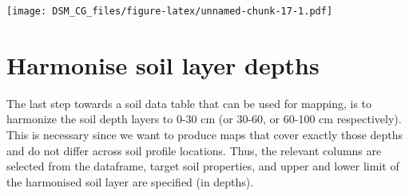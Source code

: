 \documentclass[
  10pt,
  b5paper,
  oneside]{book}
\newenvironment{Shaded}{\begin{snugshade}}{\end{snugshade}}
\newcommand{\AttributeTok}[1]{\textcolor[rgb]{0.77,0.63,0.00}{#1}}
\newcommand{\CommentTok}[1]{\textcolor[rgb]{0.56,0.35,0.01}{\textit{#1}}}
\newcommand{\DecValTok}[1]{\textcolor[rgb]{0.00,0.00,0.81}{#1}}
\newcommand{\FunctionTok}[1]{\textcolor[rgb]{0.00,0.00,0.00}{#1}}
\newcommand{\NormalTok}[1]{#1}
\newcommand{\OtherTok}[1]{\textcolor[rgb]{0.56,0.35,0.01}{#1}}
\newcommand{\SpecialCharTok}[1]{\textcolor[rgb]{0.00,0.00,0.00}{#1}}
\newcommand{\StringTok}[1]{\textcolor[rgb]{0.31,0.60,0.02}{#1}}
\begin{document}
\begin{Shaded}
\end{Shaded}

\texttt{[image: DSM\_CG\_files/figure-latex/unnamed-chunk-17-1.pdf]}

\hypertarget{harmonise-soil-layer-depths}{%
\section{Harmonise soil layer depths}\label{harmonise-soil-layer-depths}}

The last step towards a soil data table that can be used for mapping, is to harmonize the soil depth layers to 0-30 cm (or 30-60, or 60-100 cm respectively). This is necessary since we want to produce maps that cover exactly those depths and do not differ across soil profile locations. Thus, the relevant columns are selected from the dataframe, target soil properties, and upper and lower limit of the harmonised soil layer are specified (in depths).
\end{document}
